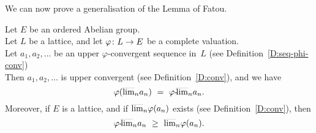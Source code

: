 \documentclass[main.tex]{subfiles}
\begin{document}
\noindent
We can now prove a generalisation of the  Lemma of Fatou.
%
%
\begin{lem}[Fatou]
\label{L:fatou}
Let $E$ be an ordered Abelian group.\\
Let $L$ be a lattice,
and let $\varphi\colon L \rightarrow E$ be a 
complete valuation.\\
Let $a_1,a_2,\dotsc$ be an upper $\varphi$-convergent
sequence in~$L$
(see Definition~\ref{D:seq-phi-conv}) \\
Then $a_1,a_2,\dotsc$ is upper convergent
(see Definition~\ref{D:conv}),
and we have
\begin{equation*}
\varphi(\ulim{n}a_n) \ =\ 
\pulim\varphi{n} a_n.
\end{equation*}
Moreover,
if $E$ is a lattice, and
if $\smash{\overline{\lim}_{n}}\varphi(a_n)$ exists
(see Definition~\ref{D:conv}), then
\begin{equation*}
{\varphi}\text{-}\!\smash{\overline{\lim}_{n}}a_n
\ \geq\  
\smash{\overline{\lim}_{n}}\varphi(a_n) .
\end{equation*}
\end{lem}
\end{document}
